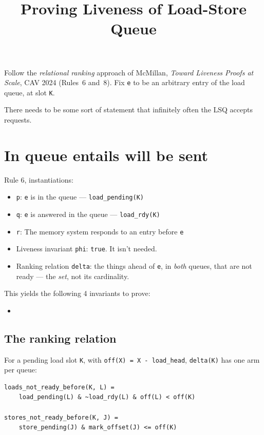 \documentclass[11pt]{article}
\title{Proving Liveness of Load-Store Queue}
\author{}
\date{}
\begin{document}
\maketitle

Follow the \emph{relational ranking} approach of McMillan, \emph{Toward
Liveness Proofs at Scale}, CAV 2024 (Rules~6 and~8). Fix \texttt{e} to be
an arbitrary entry of the load queue, at slot \texttt{K}.

There needs to be some sort of statement that infinitely often the LSQ accepts
requests. 



\section{In queue entails will be sent}
Rule 6, instantiations:
\begin{itemize}
\item \texttt{p}: \texttt{e} is in the queue --- \texttt{load_pending(K)}
\item \texttt{q}: \texttt{e} is answered in the queue --- \texttt{load_rdy(K)}
\item \texttt{r}: The memory system responds to an entry before \texttt{e}
\item Liveness invariant \texttt{phi}: \texttt{true}. It isn't needed.
\item Ranking relation \texttt{delta}: the things ahead of \texttt{e}, in
  \emph{both} queues, that are not ready --- the \emph{set}, not its
  cardinality.
\end{itemize}

This yields the following 4 invariants to prove:
\begin{itemize}
\item 
\end{itemize}

\subsection{The ranking relation}

For a pending load slot \texttt{K}, with \texttt{off(X) = X - load_head},
\texttt{delta(K)} has one arm per queue:

{\small
\begin{verbatim}
loads_not_ready_before(K, L) =
    load_pending(L) & ~load_rdy(L) & off(L) < off(K)

stores_not_ready_before(K, J) =
    store_pending(J) & mark_offset(J) <= off(K)
\end{verbatim}
}
\end{document}
